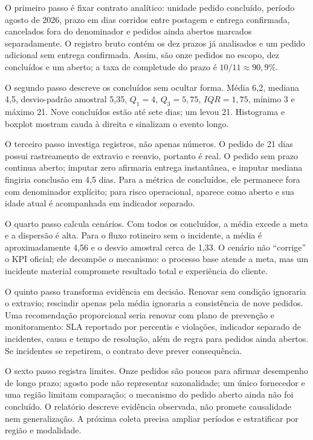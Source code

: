 O primeiro passo é fixar contrato analítico: unidade pedido concluído, período agosto de 2026, prazo em dias corridos entre postagem e entrega confirmada, cancelados fora do denominador e pedidos ainda abertos marcados separadamente. O registro bruto contém os dez prazos já analisados e um pedido adicional sem entrega confirmada. Assim, são onze pedidos no escopo, dez concluídos e um aberto; a taxa de completude do prazo é $10/11\approx90{,}9\%$.

O segundo passo descreve os concluídos sem ocultar forma. Média 6,2, mediana 4,5, desvio-padrão amostral 5,35, $Q_1=4$, $Q_3=5,75$, $IQR=1,75$, mínimo 3 e máximo 21. Nove concluídos estão até sete dias; um levou 21. Histograma e boxplot mostram cauda à direita e sinalizam o evento longo.

O terceiro passo investiga registros, não apenas números. O pedido de 21 dias possui rastreamento de extravio e reenvio, portanto é real. O pedido sem prazo continua aberto; imputar zero afirmaria entrega instantânea, e imputar mediana fingiria conclusão em 4,5 dias. Para a métrica de concluídos, ele permanece fora com denominador explícito; para risco operacional, aparece como aberto e sua idade atual é acompanhada em indicador separado.

O quarto passo calcula cenários. Com todos os concluídos, a média excede a meta e a dispersão é alta. Para o fluxo rotineiro sem o incidente, a média é aproximadamente 4,56 e o desvio amostral cerca de 1,33. O cenário não ``corrige'' o KPI oficial; ele decompõe o mecanismo: o processo base atende a meta, mas um incidente material compromete resultado total e experiência do cliente.

O quinto passo transforma evidência em decisão. Renovar sem condição ignoraria o extravio; rescindir apenas pela média ignoraria a consistência de nove pedidos. Uma recomendação proporcional seria renovar com plano de prevenção e monitoramento: SLA reportado por percentis e violações, indicador separado de incidentes, causa e tempo de resolução, além de regra para pedidos ainda abertos. Se incidentes se repetirem, o contrato deve prever consequência.

O sexto passo registra limites. Onze pedidos são poucos para afirmar desempenho de longo prazo; agosto pode não representar sazonalidade; um único fornecedor e uma região limitam comparação; o mecanismo do pedido aberto ainda não foi concluído. O relatório descreve evidência observada, não promete causalidade nem generalização. A próxima coleta precisa ampliar períodos e estratificar por região e modalidade.

